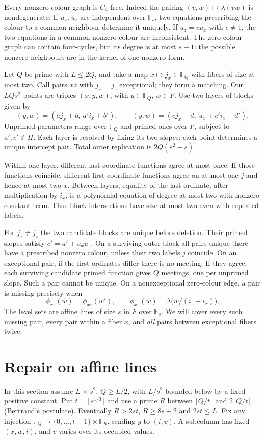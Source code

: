 \documentclass[10pt]{article}
\newcommand{\F}{\mathbb F}
\begin{document}
Every nonzero colour graph is $C_4$-free. Indeed the pairing $(v,w)\mapsto\lambda(vw)$ is nondegenerate. If $u_x,u_z$ are independent over $\F_s$, two equations prescribing the colour to a common neighbour determine it uniquely. If $u_z=c u_x$ with $c\ne1$, the two equations in a common nonzero colour are inconsistent. The zero-colour graph can contain four-cycles, but its degree is at most $s-1$: the possible nonzero neighbours are in the kernel of one nonzero form.

Let $Q$ be prime with $L\le2Q$, and take a map $x\mapsto j_x\in\F_Q$ with fibers of size at most two. Call pairs $xz$ with $j_x=j_z$ exceptional; they form a matching. Our $LQs^2$ points are triples $(x,y,w)$, with $y\in\F_Q$, $w\in F$. Use two layers of blocks given by
\[
 (y,w)=(a j_x+b,\ a'i_x+b'),\qquad
 (y,w)=(c j_x+d,\ u_x+c'i_x+d').
\]
Unprimed parameters range over $\F_Q$ and primed ones over $F$, subject to $a',c'\notin H$. Each layer is resolved by fixing its two slopes: each point determines a unique intercept pair. Total outer replication is $2Q(s^2-s)$.

Within one layer, different last-coordinate functions agree at most once. If those functions coincide, different first-coordinate functions agree on at most one $j$ and hence at most two $x$. Between layers, equality of the last ordinate, after multiplication by $i_x$, is a polynomial equation of degree at most two with nonzero constant term. Thus block intersections have size at most two even with repeated labels.

For $j_x\ne j_z$ the two candidate blocks are unique before deletion. Their primed slopes satisfy $c'=a'+u_xu_z$. On a surviving outer block all pairs unique there have a prescribed nonzero colour, unless their two labels $j$ coincide. On an exceptional pair, if the first ordinates differ there is no meeting. If they agree, each surviving candidate primed function gives $Q$ meetings, one per unprimed slope. Such a pair cannot be unique. On a nonexceptional zero-colour edge, a pair is missing precisely when
\[
 \phi_{xz}(w)=\phi_{xz}(w'),\qquad
 \phi_{xz}(w)=\lambda\big(w/(i_z-i_x)\big).
\]
The level sets are affine lines of size $s$ in $F$ over $\F_s$. We will cover every such missing pair, every pair within a fiber $x$, and \emph{all} pairs between exceptional fibers twice.

\section{Repair on affine lines}
In this section assume $L\asymp s^2$, $Q\ge L/2$, with $L/s^2$ bounded below by a fixed positive constant. Put $t=\lfloor s^{1/3}\rfloor$ and use a prime $R$ between $\lceil Q/t\rceil$ and $2\lceil Q/t\rceil$ (Bertrand's postulate). Eventually $R>2st$, $R\ge 8s+2$ and $2st\le L$. Fix any injection $\F_Q\to\{0,\ldots,t-1\}\times\F_R$, sending $y$ to $(i,v)$. A subcolumn has fixed $(x,w,i)$, and $v$ varies over its occupied values.
\end{document}
